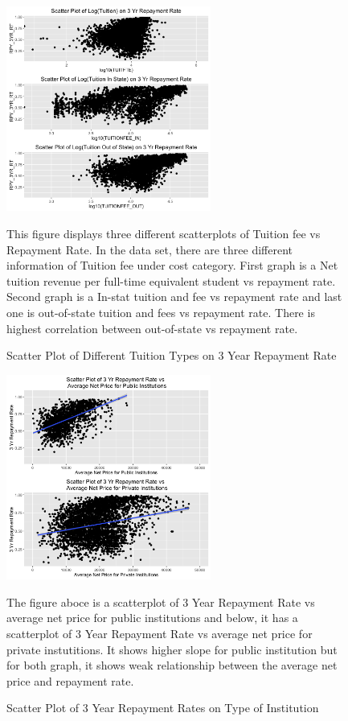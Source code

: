 \documentclass[a4paper]{article}\usepackage[]{graphicx}\usepackage[]{color}
\begin{document}
\begin{figure}
  \caption{Scatter Plot of Different Tuition Types on 3 Year Repayment Rate}
  \centering
  \includegraphics[width=0.6\textwidth]{../images/eda/rpy3yr_tuition_scatter.png}
  \centering
  \newline
  
  \raggedright
This figure displays three different scatterplots of Tuition fee vs Repayment Rate. In the data set, there are three different information of Tuition fee under cost category. First graph is a Net tuition revenue per full-time equivalent student vs repayment rate. Second graph is a In-stat tuition and fee vs repayment rate and last one is out-of-state tuition and fees vs repayment rate. There is highest correlation between out-of-state vs repayment rate.
\end{figure}


\begin{figure}
  \caption{Scatter Plot of 3 Year Repayment Rates on Type of Institution}
  \centering
  \includegraphics[width=0.6\textwidth]{../images/eda/netprice_pub_priv_rpy3yr_scatter}
  \centering
  \newline
  
  \raggedright
The figure aboce is a scatterplot of 3 Year Repayment Rate vs average net price for public institutions and below, it has a scatterplot of 3 Year Repayment Rate vs average net price for private instutitions. It shows higher slope for public institution but for both graph, it shows weak relationship between the average net price and repayment rate. 
\end{figure}
\end{document}
